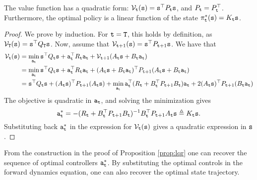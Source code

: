 \begin{proposition}\label{prop:lqr}
The value function has a quadratic form: $\mathcal{V}_{\tt t}({\tt s}) = {\tt s}^\top P_{\tt t} {\tt s}$, and $P_{\tt t}=P_{\tt t}^\top$. Furthermore, the optimal policy is a linear function of the state $\pi_{\tt t}^*({\tt s}) = K_{\tt t} {\tt s}$.
\end{proposition}
\begin{proof}
We prove by induction. For ${\tt t}={\tt T}$, this holds by definition, as $\mathcal{V}_{\tt T}({\tt s}) = {\tt s}^\top Q_{\tt T} {\tt s}$. Now, assume that $\mathcal{V}_{{\tt t}+1}({\tt s}) = {\tt s}^\top P_{{\tt t}+1} {\tt s}$. We have that 
\begin{equation*}
\begin{split}
        \mathcal{V}_{\tt t}({\tt s}) &= \min_{{\tt a}_{\tt t}} {\tt s}^\top Q_{\tt t} {\tt s} + {\tt a}_{\tt t}^\top R_{\tt t} {\tt a}_{\tt t} + \mathcal{V}_{{\tt t}+1}(A_{\tt t} {\tt s} + B_{\tt t} {\tt a}_{\tt t}) \\
        &= \min_{{\tt a}_{\tt t}} {\tt s}^\top Q_{\tt t} {\tt s} + {\tt a}_{\tt t}^\top R_{\tt t} {\tt a}_{\tt t} + (A_{\tt t} {\tt s} + B_{\tt t} {\tt a}_{\tt t})^\top P_{{\tt t}+1} (A_{\tt t} {\tt s} + B_{\tt t} {\tt a}_{\tt t}) \\
        &= {\tt s}^\top Q_{\tt t} {\tt s} + (A_{\tt t} {\tt s})^\top P_{{\tt t}+1} (A_{\tt t} {\tt s}) + \min_{{\tt a}_{\tt t}} {\tt a}_{\tt t}^\top (R_{\tt t} + B_{\tt t}^\top P_{{\tt t}+1} B_{\tt t}) {\tt a}_{\tt t} + 2(A_{\tt t} {\tt s})^\top P_{{\tt t}+1} (B_{\tt t} {\tt a}_{\tt t})
\end{split}
\end{equation*}
The objective is quadratic in ${\tt a}_{\tt t}$, and solving the minimization gives 
$${\tt a}_{\tt t}^* = -(R_{\tt t} + B_{\tt t}^\top P_{{\tt t}+1} B_{\tt t})^{-1} B_{\tt t}^\top P_{{\tt t}+1} A_{\tt t} {\tt s} \triangleq K_{\tt t} {\tt s}. $$ 
Substituting back ${\tt a}_{\tt t}^*$ in the expression for $\mathcal{V}_{\tt t}({\tt s})$ gives a quadratic expression in ${\tt s}$.
\end{proof}

From the construction in the proof of Proposition \ref{prop:lqr} one can recover the sequence of optimal controllers ${\tt a}_{\tt t}^*$. By substituting the optimal controls in the forward dynamics equation, one can also recover the optimal state trajectory.


